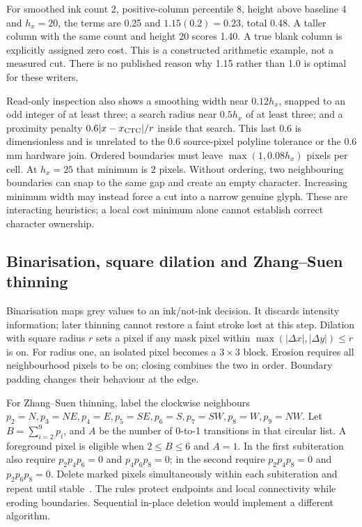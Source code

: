 For smoothed ink count 2, positive-column percentile 8, height above baseline
4 and $h_x=20$, the terms are 0.25 and $1.15(0.2)=0.23$, total 0.48.
A taller column with the same count and height 20 scores 1.40. A true blank
column is explicitly assigned zero cost. This is a constructed arithmetic
example, not a measured cut. There is no published reason why 1.15 rather
than 1.0 is optimal for these writers.

Read-only inspection also shows a smoothing width near $0.12h_x$, snapped to
an odd integer of at least three; a search radius near $0.5h_x$ of at least
three; and a proximity penalty $0.6|x-x_{\rm CTC}|/r$ inside that search.
This last 0.6 is dimensionless and is unrelated to the 0.6 source-pixel
polyline tolerance or the 0.6 mm hardware join. Ordered boundaries must
leave $\max(1,0.08h_x)$ pixels per cell. At $h_x=25$ that minimum is 2
pixels. Without ordering, two neighbouring boundaries can snap to the same
gap and create an empty character. Increasing minimum width may instead
force a cut into a narrow genuine glyph. These are interacting heuristics;
a local cost minimum alone cannot establish correct character ownership.

\subsection{Binarisation, square dilation and Zhang--Suen thinning}
Binarisation maps grey values to an ink/not-ink decision. It discards
intensity information; later thinning cannot restore a faint stroke lost at
this step. Dilation with square radius $r$ sets a pixel if any mask pixel
within $\max(|\Delta x|,|\Delta y|)\le r$ is on. For radius one, an isolated
pixel becomes a $3\times3$ block. Erosion requires all neighbourhood pixels
to be on; closing combines the two in order. Boundary padding changes their
behaviour at the edge.

For Zhang--Suen thinning, label the clockwise neighbours
$p_2=N,p_3=NE,p_4=E,p_5=SE,p_6=S,p_7=SW,p_8=W,p_9=NW$.
Let $B=\sum_{i=2}^9p_i$, and $A$ be the number of 0-to-1 transitions in
that circular list. A foreground pixel is eligible when $2\le B\le6$
and $A=1$. In the first subiteration also require
$p_2p_4p_6=0$ and $p_4p_6p_8=0$; in the second require
$p_2p_4p_8=0$ and $p_2p_6p_8=0$. Delete marked pixels simultaneously
within each subiteration and repeat until stable~\cite{zhangsuen1984,zhanglink}.
The rules protect endpoints and local connectivity while eroding boundaries.
Sequential in-place deletion would implement a different algorithm.

